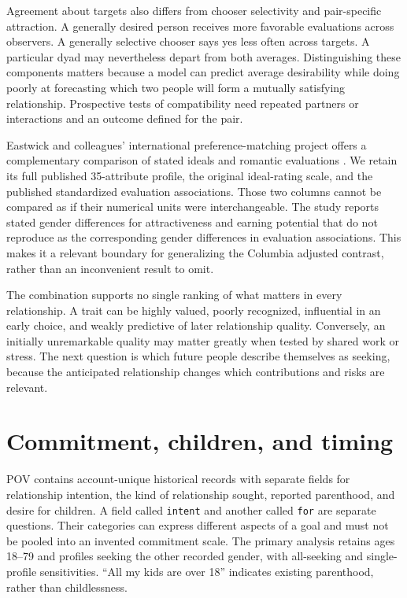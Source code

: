 Agreement about targets also differs from chooser selectivity and pair-specific attraction. A generally desired person receives more favorable evaluations across observers. A generally selective chooser says yes less often across targets. A particular dyad may nevertheless depart from both averages. Distinguishing these components matters because a model can predict average desirability while doing poorly at forecasting which two people will form a mutually satisfying relationship. Prospective tests of compatibility need repeated partners or interactions and an outcome defined for the pair.

Eastwick and colleagues' international preference-matching project offers a complementary comparison of stated ideals and romantic evaluations \citep{matching2025}. We retain its full published 35-attribute profile, the original ideal-rating scale, and the published standardized evaluation associations. Those two columns cannot be compared as if their numerical units were interchangeable. The study reports stated gender differences for attractiveness and earning potential that do not reproduce as the corresponding gender differences in evaluation associations. This makes it a relevant boundary for generalizing the Columbia adjusted contrast, rather than an inconvenient result to omit.

The combination supports no single ranking of what matters in every relationship. A trait can be highly valued, poorly recognized, influential in an early choice, and weakly predictive of later relationship quality. Conversely, an initially unremarkable quality may matter greatly when tested by shared work or stress. The next question is which future people describe themselves as seeking, because the anticipated relationship changes which contributions and risks are relevant.

\section{Commitment, children, and timing}\label{sec:minds-goals}

POV contains \MwcPovN{} account-unique historical records with separate fields for relationship intention, the kind of relationship sought, reported parenthood, and desire for children. A field called \texttt{intent} and another called \texttt{for} are separate questions. Their categories can express different aspects of a goal and must not be pooled into an invented commitment scale. The primary analysis retains ages 18--79 and profiles seeking the other recorded gender, with all-seeking and single-profile sensitivities. ``All my kids are over 18'' indicates existing parenthood, rather than childlessness.

